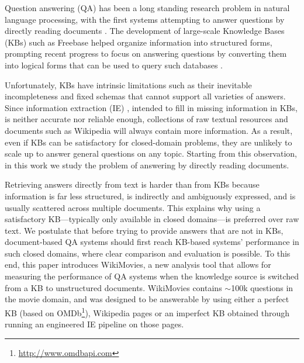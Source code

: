 



Question answering (QA) has been a long standing research problem in
natural language processing, with the first systems attempting to
answer questions by directly reading
documents \citep{voorhees2000building}. The development of large-scale Knowledge Bases (KBs) such as Freebase  \citep{bollacker2008freebase}
helped organize information into structured forms, prompting recent progress to focus on answering questions by converting them into logical forms that can be used to query such databases \citep{berant2013semantic,kwiatkowski-EtAl:2013:EMNLP,fader2014open}.

Unfortunately, KBs have intrinsic limitations such as their inevitable incompleteness and fixed schemas that cannot support all varieties of answers.
%
Since information extraction (IE) \citep{craven2000learning}, intended to
fill in missing information in KBs, is neither accurate nor
reliable enough, collections of raw textual resources and
documents such as Wikipedia will always contain more information.
%
As a result, even if KBs can be satisfactory for closed-domain problems, they are unlikely
to scale up to answer general questions on any
topic.
%
Starting from this observation,
in this work we study the problem
of answering by directly reading documents.


Retrieving answers directly from text is harder than
from KBs because information is far less structured, is
indirectly and ambiguously expressed, and is usually scattered across multiple documents.
%
%
This explains why using a satisfactory KB---typically only available in closed domains---is preferred over raw text.
%
We postulate that before trying to provide answers that are not in
KBs, document-based QA systems should first reach KB-based systems'
performance in such closed domains, where clear comparison and
evaluation is possible.
%
To this end, this paper introduces {\sc WikiMovies}, a new
analysis tool that allows for measuring the performance of %
QA systems when the knowledge source is switched from a KB to unstructured documents.
%
{\sc WikiMovies} contains $\sim$100k questions in the movie domain, and was designed
to be answerable by using either a perfect KB
(based on OMDb\footnote{\url{http://www.omdbapi.com}}), Wikipedia pages or an imperfect KB obtained through
running %
an engineered IE pipeline on those pages.

